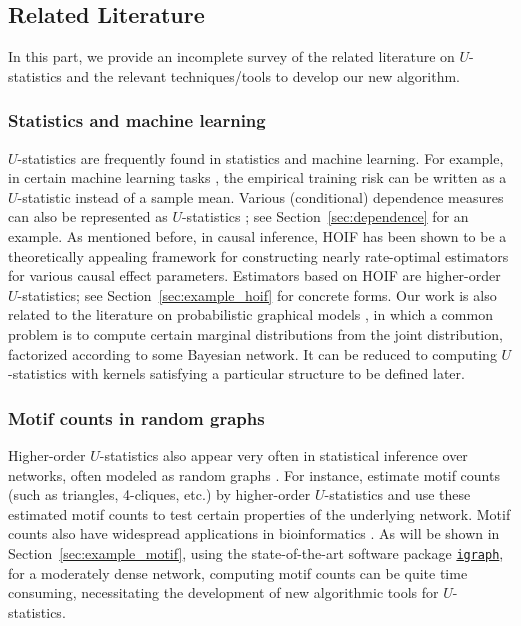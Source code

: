 \documentclass[sn-mathphys, natbib=false]{sn-jnl}
\newcommand{\libref}[2]{\href{#2}{\texttt{#1}}}
\def\igraph{\libref{igraph}{https://igraph.org/}}
\theoremstyle{plain}
\theoremstyle{definition}
\def\igraph{\libref{igraph}{https://igraph.org/}}
\begin{document}
\begin{bibunit}[agsm]
\subsection*{Related Literature}

In this part, we provide an incomplete survey of the related literature on $U$-statistics and the relevant techniques/tools to develop our new algorithm.

\subsubsection*{Statistics and machine learning}

$U$-statistics are frequently found in statistics and machine learning. For example, in certain machine learning tasks \citep{clemenccon2008ranking, clemenccon2013maximal, shen2025engression}, the empirical training risk can be written as a $U$-statistic instead of a sample mean. Various (conditional) dependence measures can also be represented as $U$-statistics \citep{yao2018testing, he2021asymptotically, shao2025u, zhang2025adaptive}; see Section~\ref{sec:dependence} for an example. As mentioned before, in causal inference, HOIF has been shown to be a theoretically appealing framework for constructing nearly rate-optimal estimators for various causal effect parameters. Estimators based on HOIF are higher-order $U$-statistics; see Section~\ref{sec:example_hoif} for concrete forms. Our work is also related to the literature on probabilistic graphical models \citep{pearl1988probabilistic, shpitser2011efficient}, in which a common problem is to compute certain marginal distributions from the joint distribution, factorized according to some Bayesian network. It can be reduced to computing $U$-statistics with kernels satisfying a particular structure to be defined later.


\subsubsection*{Motif counts in random graphs}

Higher-order $U$-statistics also appear very often in statistical inference over networks, often modeled as random graphs \citep{chatterjee2024higher, jin2025counting}. For instance, \citet{chatterjee2024higher} estimate motif counts (such as triangles, 4-cliques, etc.) by higher-order $U$-statistics and use these estimated motif counts to test certain properties of the underlying network. Motif counts also have widespread applications in bioinformatics \citep{wernicke2006fanmod}. As will be shown in Section~\ref{sec:example_motif}, using the state-of-the-art software package \igraph{}, for a moderately dense network, computing motif counts can be quite time consuming, necessitating the development of new algorithmic tools for $U$-statistics. 


\end{bibunit}
\end{document}
